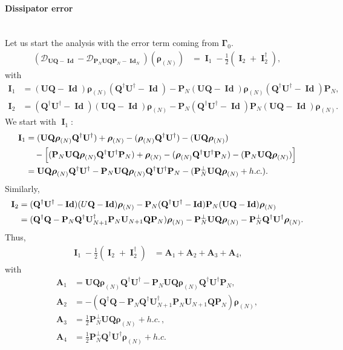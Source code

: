 \documentclass[a4paper,onecolumn,amsmath,amssymb,amsfonts,accepted=2026-03-06]{quantumarticle}
\newcommand{\Id}{\operatorname{\mathbf{Id}}}
\newcommand{\xP}{\mathbf{Q}}
\newcommand{\cD}{\mathcal D}
\newcommand{\LL}{{\mathbf{\Gamma}}}
\newcommand{\Proj}[1]{\mathbf{P}_{#1}}
\newcommand{\rN}{{\boldsymbol{\rho}_{(N)}}}
\newcommand{\Uop}{\mathbf{U}}
\begin{document}
\paragraph{Dissipator error}\mbox{}\\
Let us start the analysis with the error term coming from $\LL_0$.
\begin{align}
    (\cD_{\Uop\xP- \Id}-\cD_{\Proj{N} \Uop \xP \Proj{N} -  \Id_N})(\rN)&= \operatorname{\mathbf{I}}_1-\frac{1}{2}(\operatorname{\mathbf{I}}_2 + \operatorname{\mathbf{I}}_2^\dag),
\end{align}
with
\begin{align}
	\operatorname{\mathbf{I}}_1&=(\Uop \xP- \Id) \rN (\xP^\dagger \Uop^\dag- \Id) - \Proj{N}(\Uop \xP- \Id) \rN (\xP^\dagger \Uop^\dag- \Id)\Proj{N},\\
	\operatorname{\mathbf{I}}_2&=(\xP^\dagger \Uop^\dag- \Id) (\Uop \xP- \Id) \rN- \Proj{N}(\xP^\dagger \Uop^\dag- \Id) \Proj{N} (\Uop \xP- \Id) \rN.
\end{align}
We start with $\operatorname{\mathbf{I}}_1$:
\begin{align}
	\notag \operatorname{\mathbf{I}}_1 &= (\Uop \xP \rN \xP^\dagger \Uop^\dag)  + \rN - (\rN \xP^\dagger \Uop^\dag) - (\Uop \xP \rN)\\
	\notag& \quad - \Bigl[(\Proj{N} \Uop \xP \rN \xP^\dagger \Uop^\dag \Proj{N}) + \rN - (\rN \xP^\dagger \Uop^\dag \Proj{N}) - (\Proj{N} \Uop \xP \rN)\Bigr]\\
	 & = \Uop \xP \rN \xP^\dagger \Uop^\dag - \Proj{N} \Uop \xP \rN \xP^\dagger \Uop^\dag \Proj{N} -  (\Proj{N}^\perp \Uop \xP \rN + h.c.).
\end{align}
Similarly,
\begin{align}
	\label{GKP_term2}
	\notag \operatorname{\mathbf{I}}_2&=(\xP^\dagger \Uop^\dag -  \Id)(U\xP -  \Id)\rN - \Proj{N}(\xP^\dagger \Uop^\dag -  \Id)\Proj{N}(\Uop \xP -  \Id)\rN\ \\
	&=(\xP^\dagger\xP - \Proj{N}\xP^\dagger \Uop_{N+1}^\dagger \Proj{N} \Uop_{N+1} \xP \Proj{N})\rN -\Proj{N}^\perp \Uop \xP \rN - \Proj{N}^\perp \xP^\dagger \Uop^\dag \rN.
\end{align}
Thus,
\begin{align}
	\operatorname{\mathbf{I}}_1-\frac{1}{2}(\operatorname{\mathbf{I}}_2 + \operatorname{\mathbf{I}}_2^\dag)&=\mathbf{A}_1+\mathbf{A}_2+\mathbf{A}_3+\mathbf{A}_4,
\end{align}
with
\begin{align}
	\mathbf{A}_1&=\Uop \xP \rN \xP^\dagger \Uop^\dag - \Proj{N} \Uop \xP \rN \xP^\dagger \Uop^\dag \Proj{N} ,\\
	\mathbf{A}_2&=-(\xP^\dagger\xP - \Proj{N}\xP^\dagger \Uop_{N+1}^\dagger \Proj{N} \Uop_{N+1} \xP \Proj{N})\rN,\\
	\mathbf{A}_3&=\frac{1}{2}\Proj{N}^\perp \Uop \xP \rN + h.c.\, ,\\
	\mathbf{A}_4&=\frac{1}{2} \Proj{N}^\perp \xP^\dagger \Uop^\dag \rN + h.c.\, 
\end{align}
\end{document}
